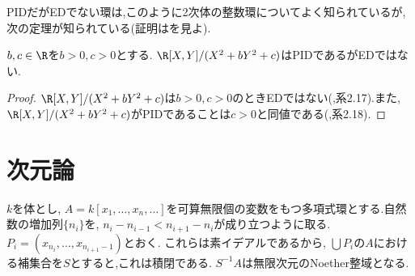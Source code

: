 PIDだがEDでない環は,このように2次体の整数環についてよく知られているが,次の定理が知られている(証明は\cite{goel2018nullstellenstze}を見よ).

\begin{thm}
	$b,c\in\R$を$b>0,c>0$とする. $\R[X,Y]/(X^2+bY^2+c)$はPIDであるがEDではない.
\end{thm}

\begin{proof}
	$\R[X,Y]/(X^2+bY^2+c)$は$b>0,c>0$のときEDではない(\cite{goel2018nullstellenstze},系2.17).また, $\R[X,Y]/(X^2+bY^2+c)$がPIDであることは$c>0$と同値である(\cite{goel2018nullstellenstze},系2.18).
\end{proof}

\section{次元論}
\begin{surex}\label{ex:無限次元Noether環}
	$k$を体とし, $A=k[x_1,\dots,x_n,\dots]$を可算無限個の変数をもつ多項式環とする.自然数の増加列$\{n_i\}$を, $n_i-n_{i-1}<n_{i+1}-n_i$が成り立つように取る. $P_i=(x_{n_i},\dots, x_{n_{i+1}-1})$とおく. これらは素イデアルであるから, $\bigcup P_i$の$A$における補集合を$S$とすると,これは積閉である. $S^{-1}A$は無限次元のNoether整域となる.
\end{surex}


